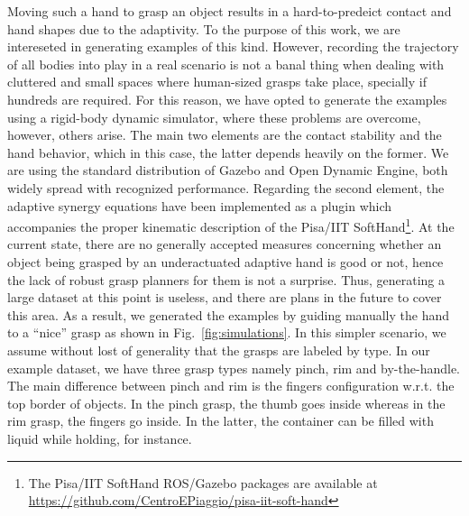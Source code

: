 Moving such a hand to grasp an object results in a hard-to-predeict contact and hand shapes due to the adaptivity. To the purpose of this work, we are intereseted in generating examples of this kind. However, recording the trajectory of all bodies into play in a real scenario is not a banal thing when dealing with cluttered and small spaces where human-sized grasps take place, specially if hundreds are required. For this reason, we have opted to generate the examples using a rigid-body dynamic simulator, where these problems are overcome, however, others arise. The main two elements are the contact stability and the hand behavior, which in this case, the latter depends heavily on the former. We are using the standard distribution of Gazebo and Open Dynamic Engine, both widely spread with recognized performance.
Regarding the second element, the adaptive synergy equations have been implemented as a plugin which accompanies the proper kinematic description of the Pisa/IIT SoftHand\footnote{The Pisa/IIT SoftHand ROS/Gazebo packages are available at \url{https://github.com/CentroEPiaggio/pisa-iit-soft-hand}}.
%
%
%
%
%
%
%
%
%
%
%
%
%
%
At the current state, there are no generally accepted measures concerning whether an object being grasped by an underactuated adaptive hand  is good or not, hence the lack of robust grasp planners for them is not a surprise. Thus, generating a large dataset at this point is useless, and there are plans in the future to cover this area. As a result, we generated the examples by guiding manually the hand to a ``nice'' grasp as shown in Fig.~\ref{fig:simulations}. In this simpler scenario, we assume without lost of generality that the grasps are labeled by type. In our example dataset, we have three grasp types namely pinch, rim and by-the-handle. The main difference between pinch and rim is the fingers configuration w.r.t. the top border of objects. In the pinch grasp, the thumb goes inside whereas in the rim grasp, the fingers go inside. In the latter, the container can be filled with liquid while holding, for instance.
